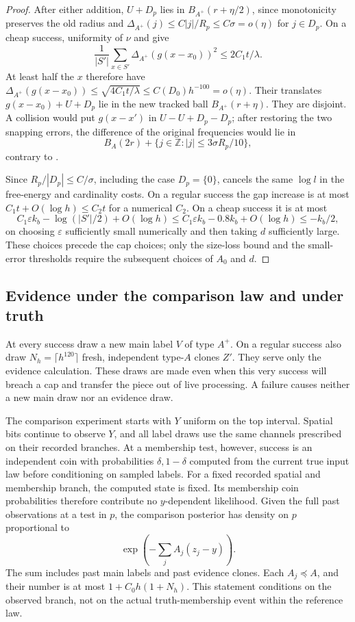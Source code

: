 \begin{proof}
After either addition, $U+D_p$ lies in $B_{A^+}(r+\eta/2)$, since
monotonicity preserves the old radius and
$\Delta_{A^+}(j)\le C|j|/R_p\le C\sigma=o(\eta)$ for $j\in D_p$.
On a cheap success, uniformity of $\nu$ and  give
\[
 \frac1{|S'|}\sum_{x\in S'}\Delta_{A^+}(g(x-x_0))^2
 \le 2C_1t/\lambda.
\]
At least half the $x$ therefore have
$\Delta_{A^+}(g(x-x_0))\le\sqrt{4C_1t/\lambda}
\le C(D_0)h^{-100}=o(\eta)$.  Their translates
$g(x-x_0)+U+D_p$ lie in the new tracked ball $B_{A^+}(r+\eta)$.
They are disjoint.  A collision would put $g(x-x')$ in
$U-U+D_p-D_p$; after restoring the two snapping errors, the difference
of the original frequencies would lie in
\[
 B_A(2r)+\{j\in\mathbb Z:|j|\le3\sigma R_p/10\},
\]
contrary to .

Since $R_p/|D_p|\le C/\sigma$, including the case $D_p=\{0\}$,
 cancels the same $\log l$ in the
free-energy and cardinality costs.  On a regular success the gap
increase is at most $C_1t+O(\log h)\le C_2t$ for a numerical $C_2$.
On a cheap success it is at most
\[
 C_1\varepsilon k_b-\log(|S'|/2)+O(\log h)
 \le C_1\varepsilon k_b-0.8k_b+O(\log h)\le-k_b/2,
\]
on choosing $\varepsilon$ sufficiently small numerically and then
taking $d$ sufficiently large.  These choices precede the cap choices;
only the size-loss bound and the small-error thresholds require the
subsequent choices of $A_0$ and $d$.
\end{proof}

\subsection{Evidence under the comparison law and under truth}

At every success draw a new main label $V$ of type $A^+$.  On a regular
success also draw $N_h=\lceil h^{120}\rceil$ fresh, independent
type-$A$ clones $Z'$.  They serve only the evidence calculation.
These draws are made even when this very success will breach a cap and
transfer the piece out of live processing.  A failure causes neither a
new main draw nor an evidence draw.

The comparison experiment starts with $Y$ uniform on the top interval.
Spatial bits continue to observe $Y$, and all label draws use the same
channels prescribed on their recorded branches.  At a membership test,
however, success is an independent coin with probabilities
$\delta,1-\delta$ computed from the current true input law before
conditioning on sampled labels.  For a fixed recorded spatial and
membership branch, the computed state is fixed.  Its membership coin
probabilities therefore contribute no $y$-dependent likelihood.  Given
the full past observations at a test in $p$, the comparison posterior
has density on $p$ proportional to
\begin{equation}\label{eq:thermal-reference-posterior}
 \exp\left(-\sum_jA_j(z_j-y)\right).
\end{equation}
The sum includes past main labels and past evidence clones.  Each
$A_j\preceq A$, and their number is at most
$1+C_0h(1+N_h)$.  This statement conditions on the observed branch,
not on the actual truth-membership event within the reference law.

